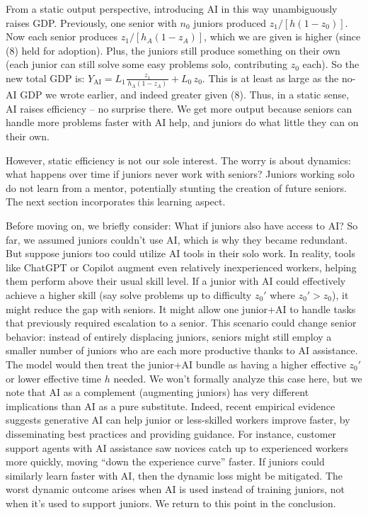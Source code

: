 \documentclass[12pt]{article}
\begin{document}
From a {static output} perspective, introducing AI in this way
unambiguously {raises GDP}. Previously, one senior with \(n_0\)
juniors produced \(z_1/[h(1-z_0)]\). Now each senior produces
\(z_1/[h_A(1-z_A)]\), which we are given is higher (since (8) held for
adoption). Plus, the juniors still produce something on their own (each
junior can still solve some easy problems solo, contributing \(z_0\)
each). So the new total GDP is:
\(Y_{\text{AI}} = L_1 \frac{z_1}{\,h_A(1-z_A)\,} + L_0 \, z_0.\) This is
{at least as large as} the no-AI GDP we wrote earlier, and indeed
greater given (8). Thus, in a static sense, AI raises efficiency -- no
surprise there. We get {more output} because seniors can handle
more problems faster with AI help, and juniors do what little they can
on their own.

However, static efficiency is not our sole interest. {The worry
is about dynamics: what happens over time if juniors never work with
seniors?} Juniors working solo do not learn from a mentor, potentially
stunting the creation of future seniors. The next section incorporates
this learning aspect.

Before moving on, we briefly consider: {What if juniors also have
access to AI?} So far, we assumed juniors couldn't use AI, which is why
they became redundant. But suppose juniors too could utilize AI tools in
their solo work. In reality, tools like ChatGPT or Copilot {augment
even relatively inexperienced workers}, helping them perform above their
usual skill level. If a junior with AI could effectively achieve a
higher skill (say solve problems up to difficulty \(z_0'\) where
\(z_0' > z_0\)), it might reduce the gap with seniors. It might allow
one junior+AI to handle tasks that previously required escalation to a
senior. This scenario could {change senior behavior}: instead of
entirely displacing juniors, seniors might still employ a smaller number
of juniors who are each more productive thanks to AI assistance. The
model would then treat the junior+AI bundle as having a higher effective
\(z_0'\) or lower effective time \(h\) needed. We won't formally analyze
this case here, but we note that {AI as a complement (augmenting
juniors)} has very different implications than AI as a pure substitute.
Indeed, recent empirical evidence suggests generative AI can {help
junior or less-skilled workers improve faster}, by disseminating best
practices and providing guidance. For instance, customer support agents
with AI assistance saw novices catch up to experienced workers more
quickly, moving ``down the experience curve'' faster. If juniors could
similarly learn faster with AI, then the dynamic loss might be
mitigated. The worst dynamic outcome arises when AI is {used
instead of training juniors}, not when it's used to support juniors. We
return to this point in the conclusion.
\end{document}
